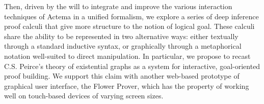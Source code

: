 Then, driven by the will to integrate and improve the various interaction
techniques of Actema in a unified formalism, we explore a series of deep
inference proof calculi that give more structure to the notion of logical goal.
These calculi share the ability to be represented in two alternative ways:
either textually through a standard inductive syntax, or graphically through a
metaphorical notation well-suited to direct manipulation. In particular, we
propose to recast C.S. Peirce's theory of existential graphs as a system for
interactive, goal-oriented proof building. We support this claim with another
web-based prototype of graphical user interface, the Flower Prover, which has
the property of working well on touch-based devices of varying screen sizes.


\begingroup %

\setlength{\textheight}{230\vscale} %

\etocstandarddisplaystyle %
\etocstandardlines %

\setcounter{tocdepth}{1}
\tableofcontents %

\listoffigures %
\setcounter{tocdepth}{2}

\let\cleardoublepage\bigskip
\let\clearpage\bigskip

\listoftables %

\endgroup


\mainmatter %

